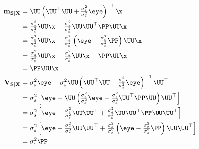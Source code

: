 \begin{align}
\label{Filt:msx2}
{\bf m}_{{\bf S}|{\bf X}}
      &= \UU \left(\UU^\top\UU + \tfrac{\sigma_\varepsilon^2}{\sigma_s^2} \eye \right)^{-1}\x  
         \nonumber\\
      &= \tfrac{\sigma_s^2}{\sigma_\varepsilon^2} \UU \x 
    	   - \tfrac{\sigma_s^2}{\sigma_\varepsilon^2} 
    	     \UU \UU^\top  \PP 
	     \UU \x  \nonumber\\
      &= \tfrac{\sigma_s^2}{\sigma_\varepsilon^2} \UU \x 
    	   - \tfrac{\sigma_s^2}{\sigma_\varepsilon^2} 
    	     \left(\eye - \tfrac{\sigma_\varepsilon^2}{\sigma_s^2} \PP \right)
	     \UU \x  \nonumber\\
      &= \tfrac{\sigma_s^2}{\sigma_\varepsilon^2} \UU \x 
    	   - \tfrac{\sigma_s^2}{\sigma_\varepsilon^2} \UU \x 
    	   + \PP \UU \x  \nonumber\\
      &= \PP \UU \x  \\
{\bf V}_{{\bf S}|{\bf X}} 
      &= \sigma_s^2\eye 
       - \sigma_s^2\UU \left(\UU^\top \UU + \tfrac{\sigma_\varepsilon^2}{\sigma_s^2}\eye\right)^{-1}
          \UU^\top    \nonumber\\
      &= \sigma_s^2
         \left[  \eye 
               - \UU
                 \left(\tfrac{\sigma_s^2}{\sigma_\varepsilon^2}\eye 
     	             - \tfrac{\sigma_s^2}{\sigma_\varepsilon^2} \UU^\top\PP\UU
                 \right)
                 \UU^\top
         \right]    \nonumber\\
      &= \sigma_s^2
         \left[  \eye
               - \tfrac{\sigma_s^2}{\sigma_\varepsilon^2} \UU \UU^\top
               + \tfrac{\sigma_s^2}{\sigma_\varepsilon^2} \UU \UU^\top\PP\UU
                 \UU^\top
         \right]    \nonumber\\
      &= \sigma_s^2
         \left[  \eye
               - \tfrac{\sigma_s^2}{\sigma_\varepsilon^2} \UU \UU^\top
               + \tfrac{\sigma_s^2}{\sigma_\varepsilon^2} 
                 \left(\eye - \tfrac{\sigma_\varepsilon^2}{\sigma_s^2} \PP\right)\UU
                 \UU^\top
         \right]    \nonumber\\
      &= \sigma_\varepsilon^2 \PP
\end{align}


